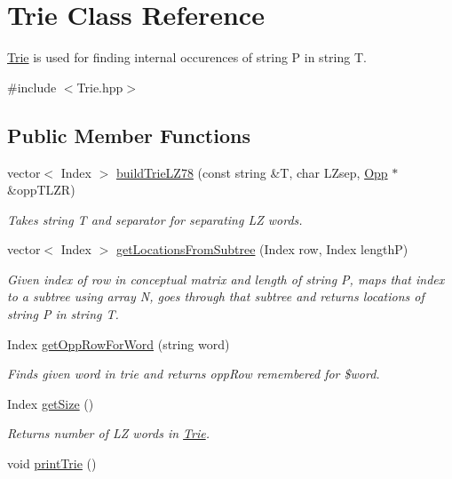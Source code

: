 \hypertarget{class_trie}{\section{\-Trie \-Class \-Reference}
\label{class_trie}
}


\hyperlink{class_trie}{\-Trie} is used for finding internal occurences of string \-P in string \-T.  




{\ttfamily \#include $<$\-Trie.\-hpp$>$}

\subsection*{\-Public \-Member \-Functions}
\begin{DoxyCompactItemize}
\item 
vector$<$ \-Index $>$ \hyperlink{class_trie_a27d392f8b23c583302ba3df760dcb5f6}{build\-Trie\-L\-Z78} (const string \&\-T, char \-L\-Zsep, \hyperlink{class_opp}{\-Opp} $\ast$\&opp\-T\-L\-Z\-R)
\begin{DoxyCompactList}\small\item\em \-Takes string \-T and separator for separating \-L\-Z words. \end{DoxyCompactList}\item 
vector$<$ \-Index $>$ \hyperlink{class_trie_acd3d2035d57a7816d923ced0ab1f27d8}{get\-Locations\-From\-Subtree} (\-Index row, \-Index length\-P)
\begin{DoxyCompactList}\small\item\em \-Given index of row in conceptual matrix and length of string \-P, maps that index to a subtree using array \-N, goes through that subtree and returns locations of string \-P in string \-T. \end{DoxyCompactList}\item 
\-Index \hyperlink{class_trie_ade3b77636341d717c5b30e101331b997}{get\-Opp\-Row\-For\-Word} (string word)
\begin{DoxyCompactList}\small\item\em \-Finds given word in trie and returns opp\-Row remembered for \$word. \end{DoxyCompactList}\item 
\hypertarget{class_trie_a52ea2aaf006bf6e1dafb3accbdbf2ddf}{\-Index \hyperlink{class_trie_a52ea2aaf006bf6e1dafb3accbdbf2ddf}{get\-Size} ()}\label{class_trie_a52ea2aaf006bf6e1dafb3accbdbf2ddf}

\begin{DoxyCompactList}\small\item\em \-Returns number of \-L\-Z words in \hyperlink{class_trie}{\-Trie}. \end{DoxyCompactList}\item 
\hypertarget{class_trie_a68065bc13f6c49bb7f139290cceff091}{void \hyperlink{class_trie_a68065bc13f6c49bb7f139290cceff091}{print\-Trie} ()}\label{class_trie_a68065bc13f6c49bb7f139290cceff091}


\end{DoxyCompactItemize}
